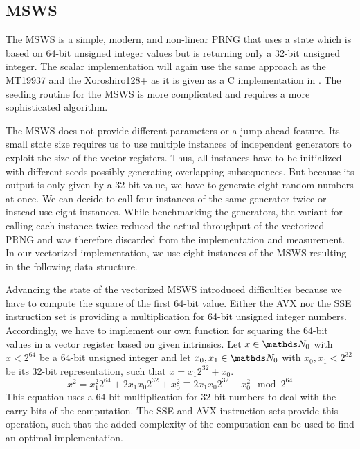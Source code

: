 \documentclass{stdlocal}
\begin{document}

  \subsection{MSWS} %
  \label{sub:middle_square_weyl_generator}
    The MSWS is a simple, modern, and non-linear PRNG that uses a state which is based on 64-bit unsigned integer values but is returning only a 32-bit unsigned integer.
    The scalar implementation will again use the same approach as the MT19937 and the Xoroshiro128+ as it is given as a C implementation in \textcite{widynski2019}.
    The seeding routine for the MSWS is more complicated and requires a more sophisticated algorithm.

    The MSWS does not provide different parameters or a jump-ahead feature.
    Its small state size requires us to use multiple instances of independent generators to exploit the size of the vector registers.
    Thus, all instances have to be initialized with different seeds possibly generating overlapping subsequences.
    But because its output is only given by a 32-bit value, we have to generate eight random numbers at once.
    We can decide to call four instances of the same generator twice or instead use eight instances.
    While benchmarking the generators, the variant for calling each instance twice reduced the actual throughput of the vectorized PRNG and was therefore discarded from the implementation and measurement.
    In our vectorized implementation, we use eight instances of the MSWS resulting in the following data structure.

    Advancing the state of the vectorized MSWS introduced difficulties because we have to compute the square of the first 64-bit value.
    Either the AVX nor the SSE instruction set is providing a multiplication for 64-bit unsigned integer numbers.
    Accordingly, we have to implement our own function for squaring the 64-bit values in a vector register based on given intrinsics.
    Let $x\in\setNatural_0$ with $x < 2^{64}$ be a 64-bit unsigned integer and let $x_0,x_1\in\setNatural_0$ with $x_0,x_1 < 2^{32}$ be its 32-bit representation, such that $x = x_1 2^{32} + x_0$.
    \[
      x^2 = x_1^2 2^{64} + 2x_1x_0 2^{32} + x_0^2 \equiv 2x_1x_0 2^{32} + x_0^2 \mod 2^{64}
    \]
    This equation uses a 64-bit multiplication for 32-bit numbers to deal with the carry bits of the computation.
    The SSE and AVX instruction sets provide this operation, such that the added complexity of the computation can be used to find an optimal implementation.
\end{document}
